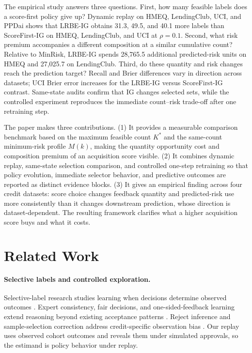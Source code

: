 The empirical study answers three questions. First, how many feasible labels does a score-first policy give up? Dynamic replay on HMEQ, LendingClub, UCI, and PPDai shows that LRBE-IG obtains 31.3, 49.5, and 40.1 more labels than ScoreFirst-IG on HMEQ, LendingClub, and UCI at $\rho=0.1$. Second, what risk premium accompanies a different composition at a similar cumulative count? Relative to MinRisk, LRBE-IG spends 28,765.5 additional predicted-risk units on HMEQ and 27,025.7 on LendingClub. Third, do these quantity and risk changes reach the prediction target? Recall and Brier differences vary in direction across datasets; UCI Brier error increases for the LRBE-IG versus ScoreFirst-IG contrast. Same-state audits confirm that IG changes selected sets, while the controlled experiment reproduces the immediate count--risk trade-off after one retraining step.

The paper makes three contributions. (1) It provides a measurable comparison benchmark based on the maximum feasible count $K^*$ and the same-count minimum-risk profile $M(k)$, making the quantity opportunity cost and composition premium of an acquisition score visible. (2) It combines dynamic replay, same-state selection comparison, and controlled one-step retraining so that policy evolution, immediate selector behavior, and predictive outcomes are reported as distinct evidence blocks. (3) It gives an empirical finding across four credit datasets: score choice changes feedback quantity and predicted-risk use more consistently than it changes downstream prediction, whose direction is dataset-dependent. The resulting framework clarifies what a higher acquisition score buys and what it costs.

\section{Related Work}
\label{sec:related}

\paragraph{Selective labels and controlled exploration.}
Selective-label research studies learning when decisions determine observed outcomes \cite{lakkaraju2017selective,kleinberg2018human}. Expert consistency, fair decisions, and one-sided-feedback learning extend reasoning beyond existing acceptance patterns \cite{dearteaga2018expert,kilbertus2020fair,jiang2021onesided}. Reject inference and sample-selection correction address credit-specific observation bias \cite{banasik2007reject,marshall2010selection}. Our replay uses observed cohort outcomes and reveals them under simulated approvals, so the estimand is policy behavior under replay.

